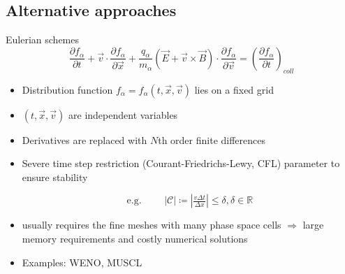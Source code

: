\documentclass{beamer}
\begin{document}
\subsection{Alternative approaches}




\begin{frame}{Eulerian schemes}
$$\frac{\partial f_{\alpha}}{\partial t} + \vec{v}\cdot \frac{\partial f_{\alpha}}{\partial \vec{x}} + \frac{q_{\alpha}}{m_{\alpha}}\left( \vec{E} + \vec{v} \times \vec{B}\right)\cdot \frac{\partial f_{\alpha}}{\partial \vec{v}}  =  \left(\frac{\partial f_{\alpha}}{\partial t}\right)_{coll}$$

\begin{itemize}
\item Distribution function $f_{\alpha} = f_{\alpha}(t,\vec{x},\vec{v})$ lies on a fixed grid
\item $(t,\vec{x},\vec{v})$ are independent variables
\item Derivatives are replaced with $N$th order finite differences
\item Severe time step restriction (Courant-Friedrichs-Lewy, CFL) parameter to ensure stability

$$\text{e.g. } \qquad |\mathcal{C}| \coloneqq |\tfrac{v\Delta t}{\Delta x}| \leq \delta, \delta \in\mathbb{R}$$

\item usually requires the fine meshes with many phase space cells $\Rightarrow$ large memory requirements and costly numerical solutions

\item Examples: WENO, MUSCL

\end{itemize}

\end{frame}

\end{document}
